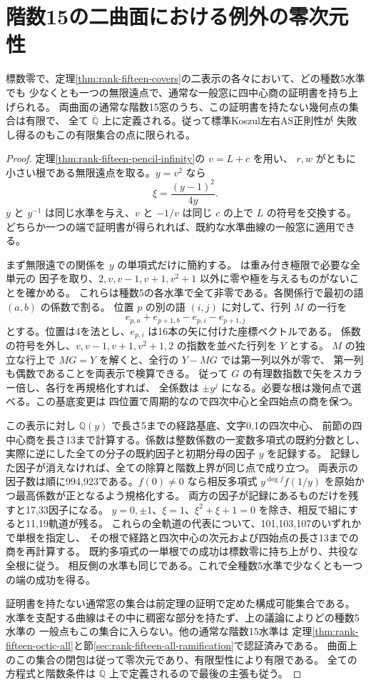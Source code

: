 \section{階数15の二曲面における例外の零次元性}
\label{sec:rank-fifteen-vertical-curves}
\begin{theorem}\label{thm:rank-fifteen-vertical-curves}
標数零で、定理\ref{thm:rank-fifteen-covers}の二表示の各々において、どの種数5水準でも
少なくとも一つの無限遠点で、通常な一般窓に四中心商の証明書を持ち上げられる。
両曲面の通常な階数15窓のうち、この証明書を持たない幾何点の集合は有限で、
全て $\overline{\mathbb Q}$ 上に定義される。従って標準Koszul左右AS正則性が
失敗し得るのもこの有限集合の点に限られる。
\end{theorem}
\begin{proof}
定理\ref{thm:rank-fifteen-pencil-infinity}の $v=L+c$ を用い、
$r,w$ がともに小さい根である無限遠点を取る。$y=v^2$ なら
\[
 \xi=\frac{(y-1)^2}{4y}.
\]
$y$ と $y^{-1}$ は同じ水準を与え、$v$ と $-1/v$ は同じ $c$ の上で $L$ の符号を交換する。
どちらか一つの端で証明書が得られれば、既約な水準曲線の一般窓に適用できる。

まず無限遠での関係を $y$ の単項式だけに簡約する。
 は重み付き極限で必要な全単元の
因子を取り、$2,v,v-1,v+1,v^2+1$ 以外に零や極を与えるものがないことを確かめる。
これらは種数5の各水準で全て非零である。各関係行で最初の語 $(a,b)$ の係数で割る。
位置 $p$ の別の語 $(i,j)$ に対して、行列 $M$ の一行を
\[
 e_{p,a}+e_{p+1,b}-e_{p,i}-e_{p+1,j}
\]
とする。位置は4を法とし、$e_{p,i}$ は16本の矢に付けた座標ベクトルである。
係数の符号を外し、$v,v-1,v+1,v^2+1,2$ の指数を並べた行列を $Y$ とする。
$M$ の独立な行上で $MG=Y$ を解くと、全行の $Y-MG$ では第一列以外が零で、
第一列も偶数であることを両表示で検算できる。
従って $G$ の有理数指数で矢をスカラー倍し、各行を再規格化すれば、
全係数は $\pm y^j$ になる。必要な根は幾何点で選べる。この基底変更は
四位置で周期的なので四次中心と全四始点の商を保つ。

この表示に対し $\mathbb Q(y)$ で長さ5までの経路基底、文字0,1の四次中心、
前節の四中心商を長さ13まで計算する。係数は整数係数の一変数多項式の既約分数とし、
実際に逆にした全ての分子の既約因子と初期分母の因子 $y$ を記録する。
記録した因子が消えなければ、全ての除算と階数上界が同じ点で成り立つ。
両表示の因子数は順に994,923である。$f(0)\ne0$ なら相反多項式
$y^{\deg f}f(1/y)$ を原始かつ最高係数が正となるよう規格化する。
両方の因子が記録にあるものだけを残すと17,33因子になる。
$y=0,\pm1$、$\xi=1$、$\xi^2+\xi+1=0$ を除き、相反で組にすると11,19軌道が残る。
これらの全軌道の代表について、101,103,107のいずれかで単根を指定し、
その根で経路と四次中心の次元および四始点の長さ13までの商を再計算する。
既約多項式の一単根での成功は標数零に持ち上がり、共役な全根に従う。
相反側の水準も同じである。これで全種数5水準で少なくとも一つの端の成功を得る。

証明書を持たない通常窓の集合は前定理の証明で定めた構成可能集合である。
水準を支配する曲線はその中に稠密な部分を持たず、上の議論によりどの種数5水準の
一般点もこの集合に入らない。他の通常な階数15水準は
定理\ref{thm:rank-fifteen-octic-all}と節\ref{sec:rank-fifteen-all-ramification}で認証済みである。
曲面上のこの集合の閉包は従って零次元であり、有限型性により有限である。
全ての方程式と階数条件は $\overline{\mathbb Q}$ 上で定義されるので最後の主張も従う。
\end{proof}
